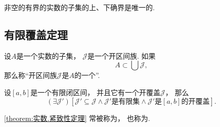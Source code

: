 \begin{theorem}
非空的有界的实数的子集的上、下确界是唯一的.
\end{theorem}

\subsection{有限覆盖定理}
\begingroup
\def\J{\mathscr{J}}%
\begin{definition}
设\(A\)是一个实数的子集，
\(\J\)是一个开区间族.
如果\[
	A \subset \bigcup \J,
\]
那么称“开区间族\(\J\)是\(A\)的一个”.
\end{definition}

\begin{theorem}[紧致性定理]\label{theorem:实数.紧致性定理}
设\([a,b]\)是一个有限闭区间，
并且它有一个开覆盖\(\J\)，
那么\[
	(\exists \J')
	[
		\J' \subseteq \J
		\land
		\text{\(\J'\)是有限集}
		\land
		\text{\(\J'\)是\([a,b]\)的开覆盖}
	].
\]
\end{theorem}
\cref{theorem:实数.紧致性定理} 常被称为，
也称为.

\endgroup%
